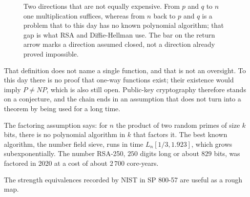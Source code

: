 \begin{figure}[htbp]
\centering
{}
\caption{Two directions that are not equally expensive. From $p$ and $q$ to $n$ one multiplication
suffices, whereas from $n$ back to $p$ and $q$ is a problem that to this day has no known polynomial
algorithm; that gap is what RSA and Diffie-Hellman use. The bar on the return arrow marks a direction
assumed closed, not a direction already proved impossible.}
\label{fig:tangga-satu-arah}
\end{figure}

That definition does not name a single function, and that is not an oversight. To this day there is
no proof that one-way functions exist; their existence would imply $P\neq NP$, which is also still
open. Public-key cryptography therefore stands on a conjecture, and the chain ends in an assumption
that does not turn into a theorem by being used for a long time.

The factoring assumption says: for $n$ the product of two random primes of size $k$ bits, there is no
polynomial algorithm in $k$ that factors it. The best known algorithm, the number field sieve, runs
in time $L_n[1/3,1.923]$, which grows subexponentially. The number RSA-250, $250$ digits long or
about $829$ bits, was factored in 2020 at a cost of about $2\,700$ core-years.

The strength equivalences recorded by NIST in SP 800-57 are useful as a rough map.

